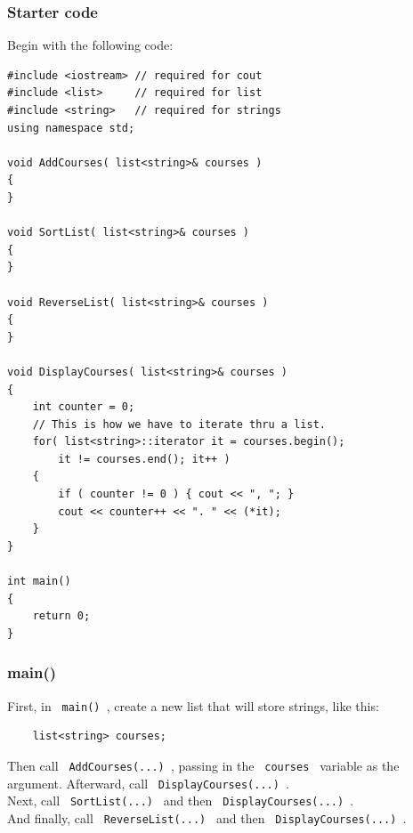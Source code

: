 \documentclass[a4paper,12pt]{book}
\begin{document}
                \hrulefill{}
                \subsubsection*{ Starter code }
                    Begin with the following code:

\begin{lstlisting}[style=code]
#include <iostream> // required for cout
#include <list>     // required for list
#include <string>   // required for strings
using namespace std;

void AddCourses( list<string>& courses )
{
}

void SortList( list<string>& courses )
{
}

void ReverseList( list<string>& courses )
{
}

void DisplayCourses( list<string>& courses )
{
    int counter = 0;
    // This is how we have to iterate thru a list.
    for( list<string>::iterator it = courses.begin();
        it != courses.end(); it++ )
    {
        if ( counter != 0 ) { cout << ", "; }
        cout << counter++ << ". " << (*it);
    }
}

int main()
{
    return 0;
}
\end{lstlisting}

                \hrulefill{}
                \subsubsection*{ main() }
                    First, in \texttt{ main() }, create a new list
                    that will store strings, like this:

\begin{verbatim}
    list<string> courses;
\end{verbatim}

                    Then call \texttt{ AddCourses(...) }, passing in
                    the \texttt{ courses } variable as the argument.
                    Afterward, call \texttt{ DisplayCourses(...) }. \\

                    Next, call \texttt{ SortList(...) } and then
                    \texttt{ DisplayCourses(...) }. \\

                    And finally, call \texttt{ ReverseList(...) } and then
                    \texttt{ DisplayCourses(...) }. \\
\end{document}
